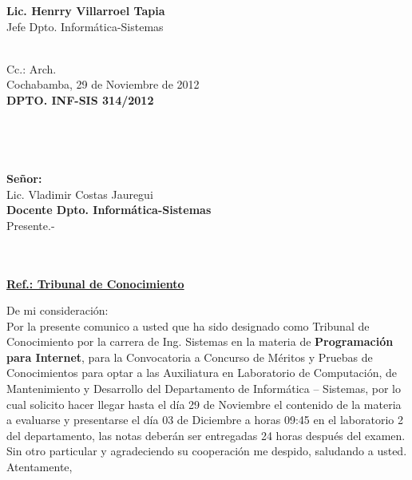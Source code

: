\documentclass[letterpaper,11pt]{letter}
\begin{document}
\vspace{3.5cm}
\begin{center}
\begin{minipage}[b]{0.5\textwidth}
\begin{center}
{\bf Lic. Henrry Villarroel Tapia}\\
Jefe Dpto. Informática-Sistemas\\
\end{center}
\end{minipage}
\end{center}
~\\
Cc.: Arch.\\
\newpage
Cochabamba, 29 de Noviembre de 2012~\\
 \textbf{DPTO. INF-SIS 314/2012}\\
~\\
~\\
~\\
~\\
 \textbf{Señor:}~\\
Lic. Vladimir Costas Jauregui~\\
 \textbf{Docente Dpto. Informática-Sistemas}~\\
Presente.-\\
~\\
~\\
\begin{center}
\underline{ \textbf{Ref.: Tribunal de Conocimiento}}
\end{center}
De mi consideración:\\
Por la presente comunico a usted que ha sido designado como Tribunal de Conocimiento por la carrera de Ing. Sistemas en la materia de \textbf{Programación para Internet}, para la Convocatoria a Concurso de Méritos y Pruebas de Conocimientos para optar a las Auxiliatura en Laboratorio de Computación, de Mantenimiento y Desarrollo del Departamento de Informática – Sistemas, por lo cual solicito hacer llegar hasta el día 29 de Noviembre el contenido de la materia a evaluarse y presentarse el día 03 de Diciembre a horas 09:45 en el laboratorio 2 del departamento, las notas deberán ser entregadas 24 horas después del examen.\\
Sin otro particular y agradeciendo su cooperación me despido, saludando a usted.\\
Atentamente,\\
\end{document}
